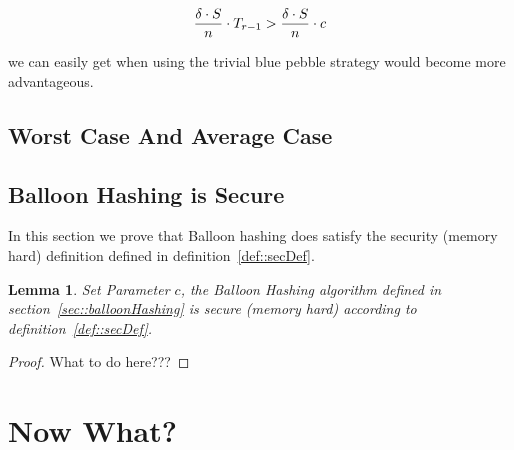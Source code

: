 \documentclass[a4paper]{article}
\newtheorem{lemma}{Lemma}
\begin{document}
\begin{align}
  \frac{\delta \cdot S}{n} \cdot T_{r - 1} > \frac{\delta \cdot S}{n} \cdot c\label{equ::rBound}
\end{align}

we can easily get when using the trivial blue pebble strategy would become more advantageous.

\subsection{Worst Case And Average Case}


\subsection{Balloon Hashing is Secure} %
In this section we prove that Balloon hashing does satisfy the security (memory hard) definition defined
in definition~\ref{def::secDef}.

\begin{lemma}
  Set Parameter $c$, the Balloon Hashing algorithm defined in section~\ref{sec::balloonHashing} is secure (memory hard)
  according to definition~\ref{def::secDef}.
\end{lemma}

\begin{proof}
  What to do here???
\end{proof}

\section{Now What?}



\end{document}

